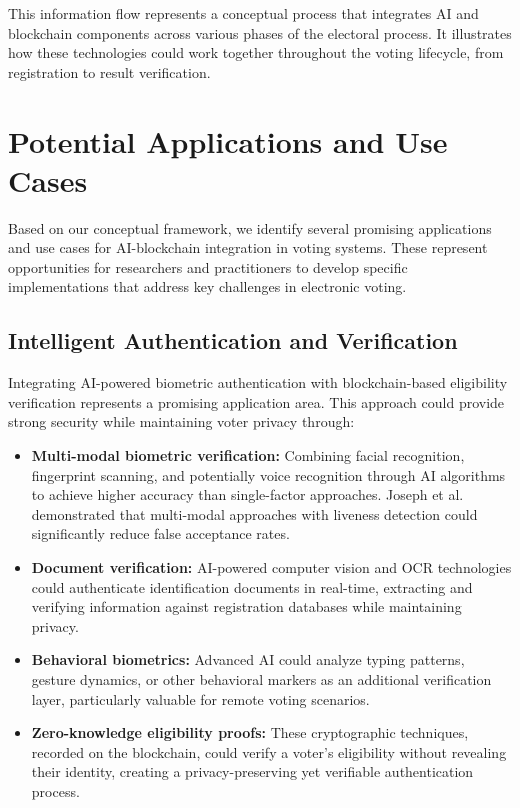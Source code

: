 \documentclass[conference]{IEEEtran}
\begin{document}
This information flow represents a conceptual process that integrates AI and blockchain components across various phases of the electoral process. It illustrates how these technologies could work together throughout the voting lifecycle, from registration to result verification.

\section{Potential Applications and Use Cases}
Based on our conceptual framework, we identify several promising applications and use cases for AI-blockchain integration in voting systems. These represent opportunities for researchers and practitioners to develop specific implementations that address key challenges in electronic voting.

\subsection{Intelligent Authentication and Verification}
Integrating AI-powered biometric authentication with blockchain-based eligibility verification represents a promising application area. This approach could provide strong security while maintaining voter privacy through:

\begin{itemize}
    \item \textbf{Multi-modal biometric verification:} Combining facial recognition, fingerprint scanning, and potentially voice recognition through AI algorithms to achieve higher accuracy than single-factor approaches. Joseph et al. \cite{b6} demonstrated that multi-modal approaches with liveness detection could significantly reduce false acceptance rates.
    
    \item \textbf{Document verification:} AI-powered computer vision and OCR technologies could authenticate identification documents in real-time, extracting and verifying information against registration databases while maintaining privacy.
    
    \item \textbf{Behavioral biometrics:} Advanced AI could analyze typing patterns, gesture dynamics, or other behavioral markers as an additional verification layer, particularly valuable for remote voting scenarios.
    
    \item \textbf{Zero-knowledge eligibility proofs:} These cryptographic techniques, recorded on the blockchain, could verify a voter's eligibility without revealing their identity, creating a privacy-preserving yet verifiable authentication process.
\end{itemize}
\end{document}
